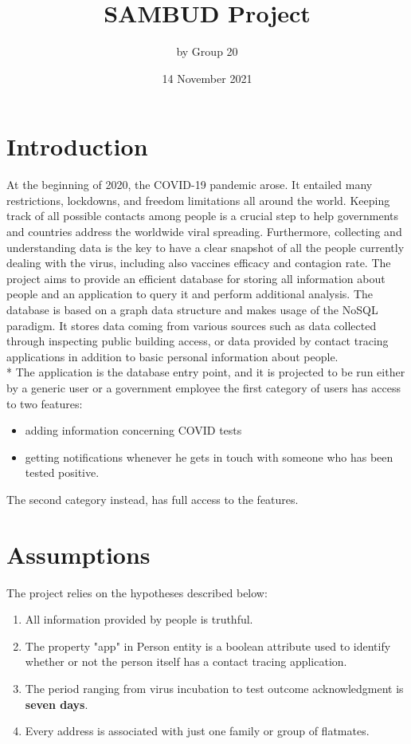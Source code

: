\documentclass[a4paper, 12p]{article}
\title{\Large{\textbf{SAMBUD Project}}}
\author{by Group 20}
\date{14 November 2021}
\begin{document}
\maketitle

\section{Introduction}
At the beginning of 2020, the COVID-19 pandemic arose. It entailed many restrictions, lockdowns, and freedom limitations all around the world.
Keeping track of all possible contacts among people is a crucial step to help governments and countries address the worldwide viral spreading.
Furthermore, collecting and understanding data is the key to have a clear snapshot of all the people currently dealing with the virus, including also vaccines efficacy and contagion rate.
The project aims to provide an efficient database for storing all information about people and an application to query it and perform additional analysis.
The database is based on a graph data structure and makes usage of the NoSQL paradigm.
It stores data coming from various sources such as data collected through inspecting public building access, or data provided by contact tracing applications in addition to basic personal information about people.
\\* The application is the database entry point, and it is projected to be run either by a generic user or a government employee
the first category of users has access to two features:
\begin{itemize}
    \item adding information concerning COVID tests
    \item getting notifications whenever he gets in touch with someone who has been tested positive.
\end{itemize}
The second category instead, has full access to the features.

\section{Assumptions}
The project relies on the hypotheses described below:

\begin{enumerate}
    \item All information provided by people is truthful.
    \item The property "app" in Person entity is a boolean attribute used to identify whether or not the person itself has a contact tracing application.
    \item The period ranging from virus incubation to test outcome acknowledgment is \textbf{seven days}.
    \item Every address is associated with just one family or group of flatmates.
\end{enumerate}
\end{document}
